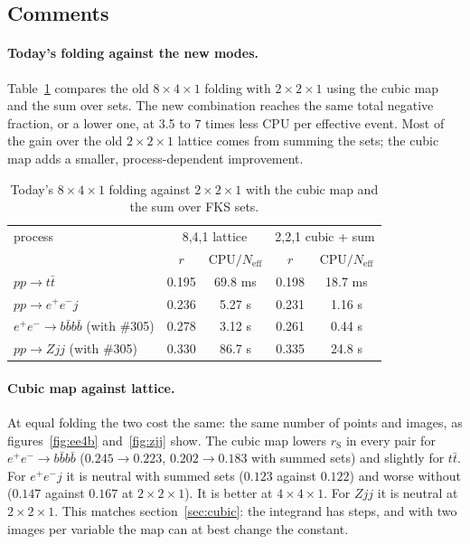 \documentclass[11pt,a4paper]{article}
\newcommand{\rS}{r_{\mathrm S}}
\newcommand{\Neff}{N_{\mathrm{eff}}}
\begin{document}
\subsection{Comments}

\paragraph{Today's folding against the new modes.}
Table~\ref{tab:summary} compares the old $8\times4\times1$ folding with $2\times2\times1$
using the cubic map and the sum over sets. The new combination reaches the same total
negative fraction, or a lower one, at 3.5 to 7 times less CPU per effective event. Most of
the gain over the old $2\times2\times1$ lattice comes from summing the sets; the cubic map
adds a smaller, process-dependent improvement.

\begin{table}[t]
\centering
\begin{tabular}{lcccc}
\toprule
process & \multicolumn{2}{c}{8,4,1 lattice} & \multicolumn{2}{c}{2,2,1 cubic + sum}\\
 & $r$ & CPU$/\Neff$ & $r$ & CPU$/\Neff$\\
\midrule
$pp\to t\bar t$ & 0.195 & 69.8 ms & 0.198 & 18.7 ms\\
$pp\to e^+e^-j$ & 0.236 & 5.27 s & 0.231 & 1.16 s\\
$e^+e^-\to b\bar b b\bar b$ (with \#305) & 0.278 & 3.12 s & 0.261 & 0.44 s\\
$pp\to Zjj$ (with \#305) & 0.330 & 86.7 s & 0.335 & 24.8 s\\
\bottomrule
\end{tabular}
\caption{Today's $8\times4\times1$ folding against $2\times2\times1$ with the cubic map and the sum over FKS sets.}
\label{tab:summary}
\end{table}

\paragraph{Cubic map against lattice.}
At equal folding the two cost the same: the same number of points and images, as
figures~\ref{fig:ee4b} and~\ref{fig:zjj} show. The cubic map lowers $\rS$ in every pair for
$e^+e^-\to b\bar b b\bar b$ ($0.245\to0.223$, $0.202\to0.183$ with summed sets) and slightly
for $t\bar t$. For $e^+e^-j$ it is neutral with summed sets ($0.123$ against $0.122$) and worse without
($0.147$ against $0.167$ at $2\times2\times1$). It is better at $4\times4\times1$. For $Zjj$ it
is neutral at $2\times2\times1$. This matches section~\ref{sec:cubic}: the integrand has
steps, and with two images per variable the map can at best change the constant.
\end{document}
